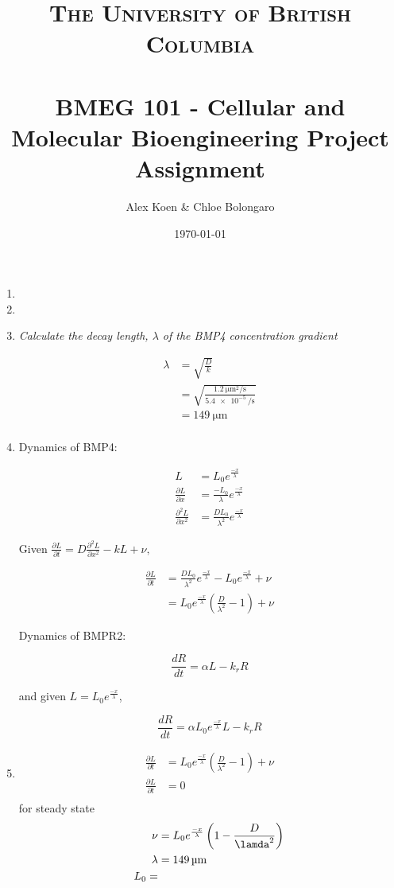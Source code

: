 \documentclass{article} %
\title{
  \normalfont \normalsize
  \textsc{The University of British Columbia} \\ [25pt] %
  \horrule{0.5pt} \\[0.4cm] %
  \huge BMEG 101 - Cellular and Molecular Bioengineering Project Assignment %
  \horrule{2pt} \\[0.5cm] %
}
\author{Alex Koen \& Chloe Bolongaro} %
\date{\normalsize \today} %
\begin{document}
\maketitle %

\onehalfspacing

\begin{enumerate}
    \item 
    \item 
    \item \textit{Calculate the decay length, $\lambda$ of the BMP4 concentration gradient}
    
    \begin{align*}
        \lambda &= \sqrt{\frac{D}{k}} \\
        &= \sqrt{\frac{\SI{1.2}{\micro\m^2\per\s}}{\SI{5.4e-5}{\per\s}}} \\
        &= \SI{149}{\micro\m} \\
    \end{align*}
    \item Dynamics of BMP4:
    
    \begin{align*}
        L &= L_0 e^{\frac{-x}{\lambda}} \\
        \frac{\partial L}{\partial x} &= \frac{-L_0}{\lambda}e^{\frac{-x}{\lambda}} \\
        \frac{\partial ^2L}{\partial x^2} &= \frac{DL_0}{\lambda^2}e^{\frac{-x}{\lambda}}
    \end{align*}
    
    Given $\frac{\partial L }{\partial t} = D\frac{\partial^2 L}{\partial x^2}-kL+\nu,$
    
    \begin{align*}
        \frac{\partial L}{\partial t} &= \frac{DL_0}{\lambda^2}e^{\frac{-x}{\lambda}}-L_0e^{\frac{-x}{\lambda}} + \nu \\
        &= L_0e^{\frac{-x}{\lambda}}\left(\frac{D}{\lambda^2} -1 \right) + \nu
    \end{align*}{}
    
    Dynamics of BMPR2:

    $$ \frac{dR}{dt} = \alpha L-k_r R $$
        
    and given $L = L_0 e^{\frac{-x}{\lambda}}$,
    
         $$ \frac{dR}{dt} = \alpha L_0 e^{\frac{-x}{\lambda}} L-k_r R $$
         
    

    \item 
        \begin{align}
         \frac{\partial L}{\partial t} &= L_0e^{\frac{-x}{\lambda}}\left(\frac{D}{\lambda^2} -1 \right) + \nu \\
         \frac{\partial L}{\partial t} &=0 \\
        \end{align} 
        for steady state 
        \begin{align}
            \nu &=L_0e^{\frac{-x}{\lambda}}\left(1-\frac{D}{\lamda^2}\right) \\
            \lambda&=\SI{149}{\micro\m} \\ L_0=
        \end{align}
        

\end{enumerate}
\end{document}
